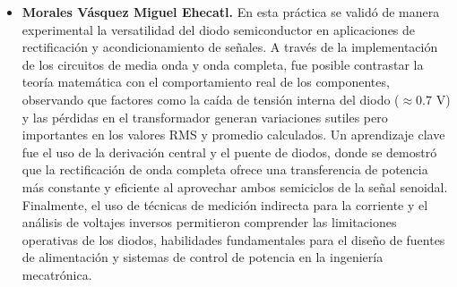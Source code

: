 \documentclass[journal]{IEEEtran}
\begin{document}
\begin{itemize}
    \item \textbf{Morales Vásquez Miguel Ehecatl.} 
    \newline En esta práctica se validó de manera experimental la versatilidad del diodo semiconductor en aplicaciones de rectificación y acondicionamiento de señales. A través de la implementación de los circuitos de media onda y onda completa, fue posible contrastar la teoría matemática con el comportamiento real de los componentes, observando que factores como la caída de tensión interna del diodo ($\approx 0.7\text{ V}$) y las pérdidas en el transformador generan variaciones sutiles pero importantes en los valores RMS y promedio calculados. Un aprendizaje clave fue el uso de la derivación central y el puente de diodos, donde se demostró que la rectificación de onda completa ofrece una transferencia de potencia más constante y eficiente al aprovechar ambos semiciclos de la señal senoidal. Finalmente, el uso de técnicas de medición indirecta para la corriente y el análisis de voltajes inversos permitieron comprender las limitaciones operativas de los diodos, habilidades fundamentales para el diseño de fuentes de alimentación y sistemas de control de potencia en la ingeniería mecatrónica.

\end{itemize}




%
\end{document}
